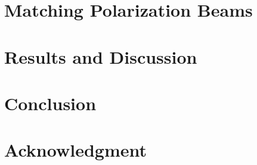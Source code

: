 \documentclass[twocolumn,numberedappendix]{emulateapj}
\begin{document}
\section{Matching Polarization Beams}
\label{sec:polbeams}

\section{Results and Discussion}
\label{sec:results}

\section{Conclusion}
\label{sec:conclusion}

\section{Acknowledgment}

\end{document}
